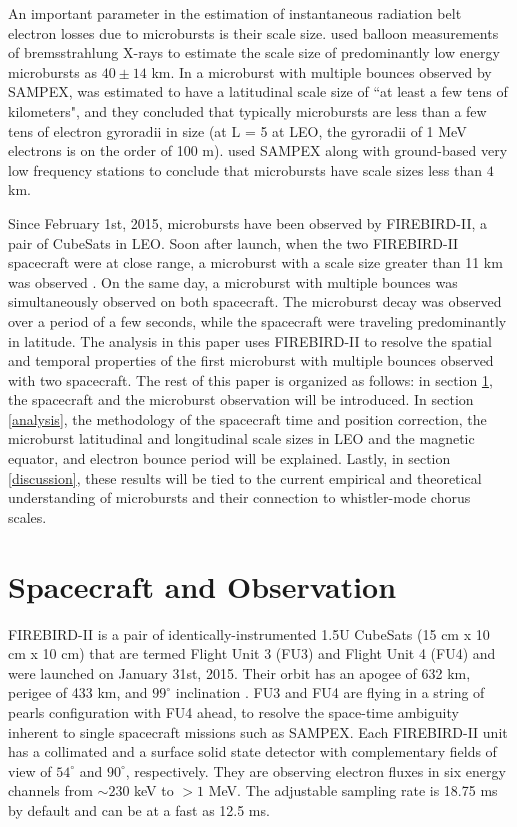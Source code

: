 \documentclass[draft, linenumbers]{agujournal}
\begin{document}
An important parameter in the estimation of instantaneous radiation belt electron losses due to microbursts is their scale size. \citet{Parks1967} used balloon measurements of bremsstrahlung X-rays to estimate the scale size of predominantly low energy microbursts as $40 \pm 14$ km. In \citet{Blake1996} a microburst with multiple bounces observed by  SAMPEX, was estimated to have a latitudinal scale size of ``at least a few tens of kilometers", and they concluded that typically microbursts are less than a few tens of electron gyroradii in size (at L = 5 at LEO, the gyroradii of 1 MeV electrons is on the order of 100 m). \citet{Dietrich2010} used SAMPEX along with ground-based very low frequency stations to conclude that microbursts have scale sizes less than $4$ km.

Since February 1st, 2015, microbursts have been observed by FIREBIRD-II, a pair of CubeSats in LEO. Soon after launch, when the two FIREBIRD-II spacecraft were at close range, a microburst with a scale size greater than 11 km was observed \citep{Crew2016}. On the same day, a microburst with multiple bounces was simultaneously observed on both spacecraft. The microburst decay was observed over a period of a few seconds, while the spacecraft were traveling predominantly in latitude. The analysis in this paper uses FIREBIRD-II to resolve the spatial and temporal properties of the first microburst with multiple bounces observed with two spacecraft. The rest of this paper is organized as follows: in section \ref{obs}, the spacecraft and the microburst observation will be introduced. In section \ref{analysis}, the methodology of the spacecraft time and position correction, the microburst latitudinal and longitudinal scale sizes in LEO and  the magnetic equator, and electron bounce period will be explained. Lastly, in section \ref{discussion}, these results will be tied to the current empirical and theoretical understanding of microbursts and their connection to whistler-mode chorus scales.

\section{Spacecraft and Observation} \label{obs} %
FIREBIRD-II is a pair of identically-instrumented 1.5U CubeSats (15 cm x 10 cm x 10 cm) that are termed Flight Unit 3 (FU3) and Flight Unit 4 (FU4) and were launched on January 31st, 2015. Their orbit has an apogee of 632 km, perigee of 433 km, and $99^{\circ}$ inclination \citep{Crew2016}. FU3 and FU4 are flying in a string of pearls configuration with FU4 ahead, to resolve the space-time ambiguity inherent to single spacecraft missions such as SAMPEX. Each FIREBIRD-II unit has a collimated and a surface solid state detector with complementary fields of view of $54^{\circ}$ and $90^{\circ}$, respectively. They are observing electron fluxes in six energy channels from $\sim 230$ keV to $> 1$ MeV. The adjustable sampling rate is 18.75 ms by default and can be at a fast as 12.5 ms. 
\end{document}
